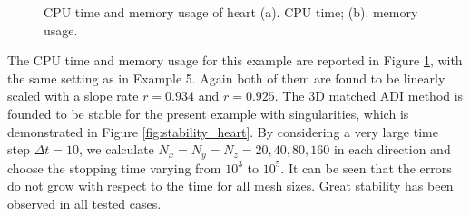 \documentclass[dissertation]{uathesis}
\begin{document}
\begin{body}
\begin{flushleft}
\begin{figure}[!ht]
\begin{center}
	\end{center}
	\caption{CPU time and memory usage of heart (a). CPU time; (b). memory usage.}
	\label{fig:CPU_Memory_heart}
\end{figure}
%
\hspace{1cm} The CPU time and memory usage for this example are reported in Figure \ref{fig:CPU_Memory_heart}, with the same setting as in Example 5. Again both of them are found to be linearly scaled with a slope rate $r=0.934$ and $r=0.925$. The 3D matched ADI method is founded to be stable for the present example with singularities, which is demonstrated in Figure \ref{fig:stability_heart}. By considering a very large time step $\Delta t=10$, we calculate $N_x=N_y=N_z=20,40,80,160$ in each direction and choose the stopping time varying from $10^{3}$ to $10^{5}$. It can be seen that the errors do not grow with respect to the time for all mesh sizes.  Great stability has been observed in all tested cases.


\end{flushleft}
\end{body}
\end{document}

